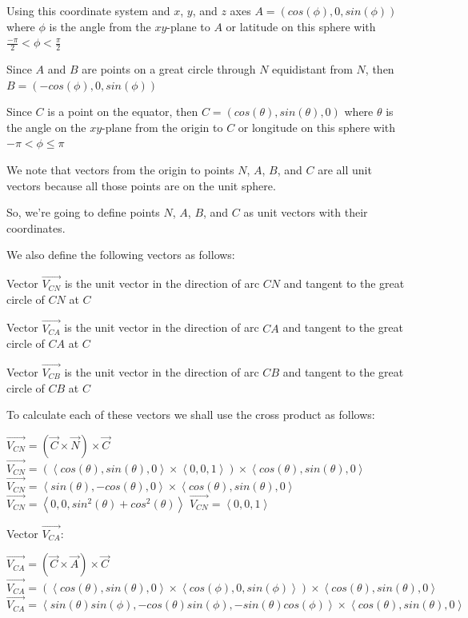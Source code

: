 \begin{enumerate}
 Using this coordinate system and $x$, $y$, and $z$ axes $A=(cos(\phi),0,sin(\phi))$ where $\phi$ is the angle from the $xy$-plane to $A$ or latitude on this sphere with $\frac{-\pi}{2} < \phi < \frac{\pi}{2}$

 Since $A$ and $B$ are points on a great circle through $N$ equidistant from $N$, then $B=(-cos(\phi),0,sin(\phi))$ 

 Since $C$ is a point on the equator, then $C=(cos(\theta),sin(\theta),0)$ where $\theta$ is the angle on the $xy$-plane from the origin to $C$ or longitude on this sphere with $-\pi < \phi \le \pi$

 We note that vectors from the origin to points $N$, $A$, $B$, and $C$ are all unit vectors because all those points are on the unit sphere.

 So, we're going to define points $N$, $A$, $B$, and $C$ as unit vectors with their coordinates.

 We also define the following vectors as follows:

 Vector $\overrightarrow{V_{CN}}$ is the unit vector in the direction of arc $CN$ and tangent to the great circle of $CN$ at $C$

 Vector $\overrightarrow{V_{CA}}$ is the unit vector in the direction of arc $CA$ and tangent to the great circle of $CA$ at $C$

 Vector $\overrightarrow{V_{CB}}$ is the unit vector in the direction of arc $CB$ and tangent to the great circle of $CB$ at $C$

 To calculate each of these vectors we shall use the cross product as follows:

 $\overrightarrow{V_{CN}}=(\overrightarrow{C}\times\overrightarrow{N})\times\overrightarrow{C}$
$\overrightarrow{V_{CN}}=(\left\langle cos(\theta),sin(\theta),0 \right\rangle\times\left\langle 0,0,1 \right\rangle)\times \left\langle cos(\theta),sin(\theta),0 \right\rangle$
$\overrightarrow{V_{CN}}=\left\langle sin(\theta),-cos(\theta),0 \right\rangle\times \left\langle cos(\theta),sin(\theta),0 \right\rangle$
$\overrightarrow{V_{CN}}=\left\langle 0,0,sin^{2}(\theta)+cos^{2}(\theta) \right\rangle$
$\overrightarrow{V_{CN}}=\left\langle 0,0,1 \right\rangle$

 Vector $\overrightarrow{V_{CA}}$:

 $\overrightarrow{V_{CA}}=(\overrightarrow{C}\times\overrightarrow{A})\times\overrightarrow{C}$
$\overrightarrow{V_{CA}}=(\left\langle cos(\theta),sin(\theta),0 \right\rangle\times\left\langle cos(\phi),0,sin(\phi) \right\rangle)\times \left\langle cos(\theta),sin(\theta),0 \right\rangle$
$\overrightarrow{V_{CA}}=\left\langle sin(\theta)sin(\phi),-cos(\theta)sin(\phi),-sin(\theta)cos(\phi) \right\rangle\times \left\langle cos(\theta),sin(\theta),0 \right\rangle$


\end{enumerate}
